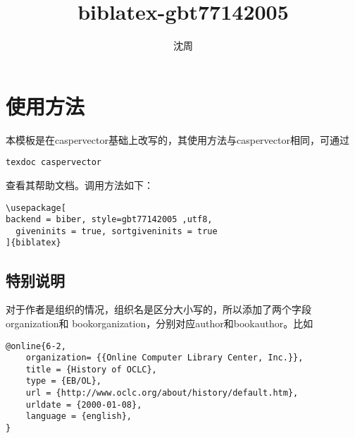 \documentclass{ctexart}
\title{biblatex-gbt77142005}
\author{沈周}
\begin{document}
\maketitle
\section{使用方法}
本模板是在caspervector基础上改写的，其使用方法与caspervector相同，可通过
\begin{verbatim}
texdoc caspervector
\end{verbatim}
查看其帮助文档。调用方法如下：
\begin{verbatim}
\usepackage[
backend = biber, style=gbt77142005 ,utf8,
  giveninits = true, sortgiveninits = true
]{biblatex}
\end{verbatim}
\subsection{特别说明}
对于作者是组织的情况，组织名是区分大小写的，所以添加了两个字段organization和
bookorganization，分别对应author和bookauthor。比如
\begin{verbatim}
@online{6-2,
    organization= {{Online Computer Library Center, Inc.}},
    title = {History of OCLC},
    type = {EB/OL},
    url = {http://www.oclc.org/about/history/default.htm},
    urldate = {2000-01-08},
    language = {english},
}
\end{verbatim}
\nocite{*}
\printbibliography[title={参考文献},heading=bibintoc]
\end{document}
